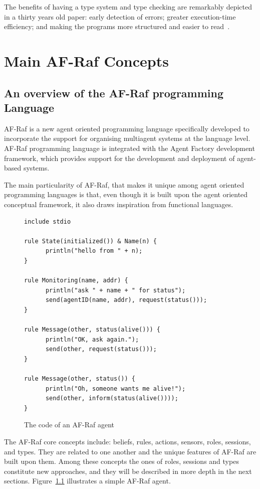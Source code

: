 \documentclass[a4paper,12pt,oneside,fleqn]{book} %
\begin{document}
The benefits of having a type system and type checking are remarkably
depicted in a thirty years old paper: early detection of
errors; greater execution-time efficiency; and making the programs more
structured and easier to read~\cite{DBLP:journals/csur/CardelliW85}.


\chapter{Main AF-Raf Concepts}\label{ch:concepts} %
\section{An overview of the AF-Raf programming Language} %

AF-Raf is a new agent oriented programming language specifically developed
to incorporate the support for organising multiagent systems at the
language level. AF-Raf programming language is integrated with the
Agent Factory development framework, which provides support for the
development and deployment of agent-based systems.

The main particularity of AF-Raf, that makes it unique among agent oriented
programming languages is that, even though it is built upon the agent
oriented conceptual framework, it also draws inspiration from functional
languages.

\begin{figure}\footnotesize %
\begin{verbatim}
include stdio

rule State(initialized()) & Name(n) {
      println("hello from " + n);
}

rule Monitoring(name, addr) {
      println("ask " + name + " for status");
      send(agentID(name, addr), request(status()));
}

rule Message(other, status(alive())) {
      println("OK, ask again.");
      send(other, request(status()));
}

rule Message(other, status()) {
      println("Oh, someone wants me alive!");
      send(other, inform(status(alive())));
}
\end{verbatim}
\caption{The code of an AF-Raf agent}
\label{fig:AF-Raf}
\end{figure} %

The AF-Raf core concepts include: beliefs, rules, actions, sensors, roles,
sessions, and types. They are related to one another and the unique
features of AF-Raf are built upon them. Among these concepts the ones of
roles, sessions and types constitute new approaches, and they will be
described in more depth in the next sections. Figure~\ref{fig:AF-Raf}
illustrates a simple AF-Raf agent.
\end{document}
